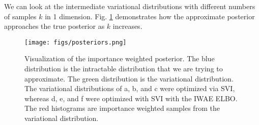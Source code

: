 \documentclass{article} %
\begin{document}
We can look at the intermediate variational distributions with different numbers of samples $k$ in 1 dimension. Fig. \ref{viz} demonstrates how the approximate posterior approaches the true posterior as $k$ increases. 

\begin{figure}[H]
  \centering
      \texttt{[image: figs/posteriors.png]}
  \caption{Visualization of the importance weighted posterior. The blue distribution is the intractable distribution that we are trying to approximate. The green distribution is the variational distribution. The variational distributions of a, b, and c were optimized via SVI, whereas d, e, and f were optimized with SVI with the IWAE ELBO. The red histograms are importance weighted samples from the variational distribution.}
  \label{viz}
\end{figure}




        
        
        

\end{document}
